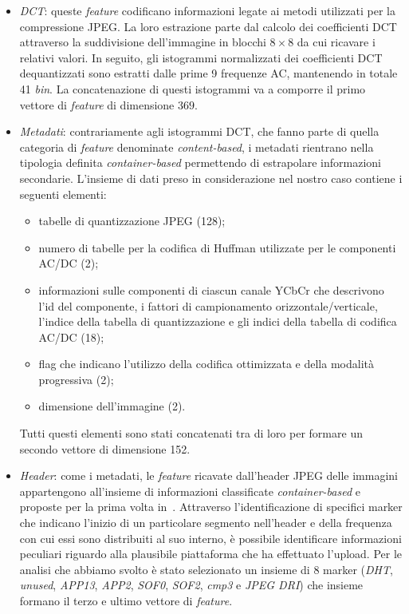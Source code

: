 \begin{itemize}
    \item \textit{DCT}: queste \textit{feature} codificano informazioni legate ai metodi utilizzati per la compressione JPEG. La loro estrazione parte dal calcolo dei coefficienti DCT attraverso la suddivisione dell'immagine in blocchi $8\times8$ da cui ricavare i relativi valori. In seguito, gli istogrammi normalizzati dei coefficienti DCT dequantizzati sono estratti dalle prime 9 frequenze AC, mantenendo in totale 41 \textit{bin}. La concatenazione di questi istogrammi va a comporre il primo vettore di \textit{feature} di dimensione $369$.
    
    \item \textit{Metadati}: contrariamente agli istogrammi DCT, che fanno parte di quella categoria di \textit{feature} denominate \textit{content-based}, i metadati rientrano nella tipologia definita \textit{container-based} permettendo di estrapolare informazioni secondarie. L'insieme di dati preso in considerazione nel nostro caso contiene i seguenti elementi:
    
        \begin{itemize}
            \item tabelle di quantizzazione JPEG (128);
            \item numero di tabelle per la codifica di Huffman utilizzate per le componenti AC/DC (2);
            \item informazioni sulle componenti di ciascun canale YCbCr che descrivono l'id del componente, i fattori di campionamento orizzontale/verticale, l'indice della tabella di quantizzazione e gli indici della tabella di codifica AC/DC (18);
            \item flag che indicano l'utilizzo della codifica ottimizzata e della modalità progressiva (2);
            \item dimensione dell'immagine (2).
        \end{itemize}
        
    Tutti questi elementi sono stati concatenati tra di loro per formare un secondo vettore di dimensione 152.
    
    \item \textit{Header}: come i metadati, le \textit{feature} ricavate dall'header JPEG delle immagini appartengono all'insieme di informazioni classificate \textit{container-based} e proposte per la prima volta in~\cite{verde2021multi}. Attraverso l'identificazione di specifici marker che indicano l'inizio di un particolare segmento nell'header e della frequenza con cui essi sono distribuiti al suo interno, è possibile identificare informazioni peculiari riguardo alla plausibile piattaforma che ha effettuato l'upload. Per le analisi che abbiamo svolto è stato selezionato un insieme di 8 marker (\textit{DHT}, \textit{unused}, \textit{APP13}, \textit{APP2}, \textit{SOF0}, \textit{SOF2}, \textit{cmp3} e \textit{JPEG DRI}) che insieme formano il terzo e ultimo vettore di \textit{feature}.
\end{itemize}


